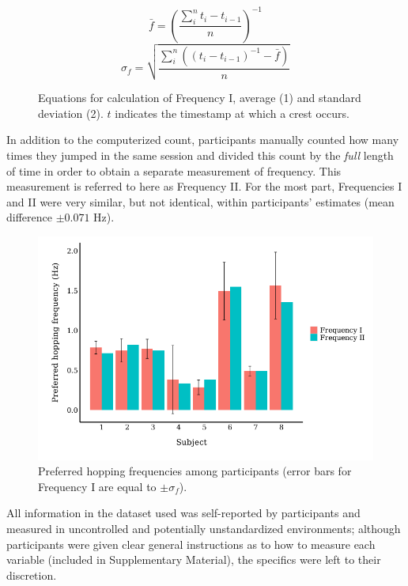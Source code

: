 \documentclass{article}
\begin{document}
\begin{figure}[h!]
\begin{equation}
\bar f = \left(\frac{\sum_{i}^{n} t_i - t_{i - 1}}{n}\right)^{-1}
\end{equation}
\begin{equation}
\sigma_f = \sqrt{\frac{\sum_{i}^{n} ((t_i - t_{i-1})^{-1} - \bar f)}{n}}
\end{equation}
\caption{\centering Equations for calculation of Frequency I, average (1) and standard deviation (2). $t$ indicates the timestamp at which a crest occurs.}
\label{fig:equations}
\end{figure}

In addition to the computerized count, participants manually counted how many times they jumped in the same session and divided this count by the \emph{full} length of time in order to obtain a separate measurement of frequency. This measurement is referred to here as Frequency II. For the most part, Frequencies I and II were very similar, but not identical, within participants' estimates (mean difference $\pm 0.071$ Hz).

\begin{figure}[h!]
	\centering
	\includegraphics[width=0.75\linewidth]{plots/preference.png}
	\caption{\centering Preferred hopping frequencies among participants (error bars for Frequency I are equal to $\pm\sigma_f$).}
	\label{fig:freqplot}
\end{figure}

All information in the dataset used was self-reported by participants and measured in uncontrolled and potentially unstandardized environments; although participants were given clear general instructions as to how to measure each variable (included in Supplementary Material), the specifics were left to their discretion.
\end{document}
